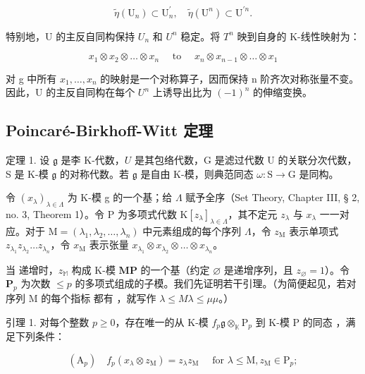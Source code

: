 \[
\tilde {\eta} (\mathrm{U} _ {n}) \subset \mathrm{U} _ {n} ^ {\prime}, \quad \tilde {\eta} (\mathrm{U} ^ {n}) \subset \mathrm{U} ^ {\prime n}.
\]

特别地，U 的主反自同构保持 \(U_{n}\) 和 \(U^{n}\) 稳定。将 \(T^{n}\) 映到自身的 K-线性映射为：

\[
x _ {1} \otimes x _ {2} \otimes \dots \otimes x _ {n} \quad \text { to } \quad x _ {n} \otimes x _ {n - 1} \otimes \dots \otimes x _ {1}
\]

对 g 中所有 \(x_{1},\ldots,x_{n}\) 的映射是一个对称算子，因而保持 n 阶齐次对称张量不变。因此，U 的主反自同构在每个 \(U^{n}\) 上诱导出比为 \((-1)^{n}\) 的伸缩变换。

\subsection{Poincaré-Birkhoff-Witt 定理}

定理 1. 设 \(\mathfrak{g}\) 是李 K-代数，\(U\) 是其包络代数，G 是滤过代数 U 的关联分次代数，S 是 K-模 \(\mathfrak{g}\) 的对称代数。若 \(\mathfrak{g}\) 是自由 K-模，则典范同态 \(\omega: \mathrm{S} \to \mathrm{G}\) 是同构。

令 \((x_{\lambda})_{\lambda \in \Lambda}\) 为 K-模 g 的一个基；给 \(\Lambda\) 赋予全序（Set Theory, Chapter III, § 2, no. 3, Theorem 1）。令 P 为多项式代数 \(\mathrm{K}[z_{\lambda}]_{\lambda \in \Lambda}\)，其不定元 \(z_{\lambda}\) 与 \(x_{\lambda}\) 一一对应。对于 \(\mathrm{M} = (\lambda_1, \lambda_2, \ldots, \lambda_n)\) 中元素组成的每个序列 \(\Lambda\)，令 \(z_{\mathrm{M}}\) 表示单项式 \(z_{\lambda_1}z_{\lambda_2}\ldots z_{\lambda_n}\)，令 \(x_{\mathrm{M}}\) 表示张量 \(x_{\lambda_1}\otimes x_{\lambda_2}\otimes \dots \otimes x_{\lambda_n}\)。

当  递增时，\(z_{\mathbb{M}}\) 构成 K-模 \(\mathbf{M}\)\(\mathbf{P}\) 的一个基（约定 \(\varnothing\) 是递增序列，且 \(z_{\varnothing} = 1\)）。令 \(\mathbf{P}_p\) 为次数 \(\leqslant p\) 的多项式组成的子模。我们先证明若干引理。（为简便起见，若对序列 M 的每个指标  都有 ，就写作 \(\lambda \leqslant M\)\(\lambda \leqslant \mu\)\(\mu\)。）

引理 1. 对每个整数 \(p \geqslant 0\)，存在唯一的从 K-模 \(f_p\)\(\mathfrak{g} \otimes_{\mathbb{K}} \mathrm{P}_p\) 到 K-模 \(\mathrm{P}\) 的同态 ，满足下列条件：

\[
\left(\mathrm{A} _ {p}\right) \quad f _ {p} \left(x _ {\lambda} \otimes z _ {\mathrm{M}}\right) = z _ {\lambda} z _ {\mathrm{M}} \quad \text {   for   } \lambda \leqslant \mathrm{M}, z _ {\mathrm{M}} \in \mathrm{P} _ {p};
\]

